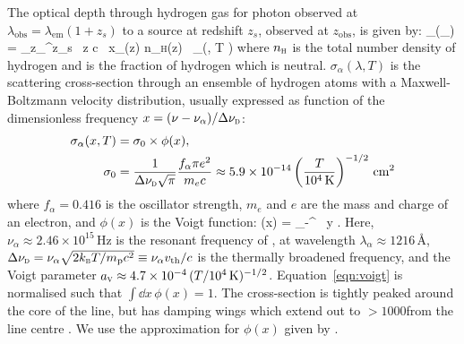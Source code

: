 \documentclass[fleqn,usenatbib]{mnras}
\begin{document}

The \lya optical depth through hydrogen gas for photon observed at $\lambda_\mathrm{obs} = \lambda_\mathrm{em}(1+z_s)$ to a source at redshift $z_s$, observed at $z_\mathrm{obs}$, is given by:
%
\BE \label{eqn:optdepth}
\tau_\alpha(\lambda_) = \int_{z_}^{z_s} \, \dd z \; c  \, x_\HI(z) n_\textsc{h}(z)  \, \sigma_\alpha\left(, T \right)
\EE
%
where $n_\textsc{h}$ is the total number density of hydrogen and \xHI is the fraction of hydrogen which is neutral. $\sigma_\alpha(\lambda, T)$ is the \lya scattering cross-section through an ensemble of hydrogen atoms with a Maxwell-Boltzmann velocity distribution, usually expressed as function of the dimensionless frequency $x = (\nu - \nu_\alpha)/\Delta \nu_\textsc{d}$:
%
\begin{align} \label{eqn:crosssection}
\sigma_\alpha(x, T) &= \sigma_0 \times \phi(x),\\
\sigma_0 &= \frac{1}{\Delta \nu_\textsc{d} \sqrt{\pi}} \frac{f_\alpha \pi e^2}{m_e c} \approx 5.9 \times 10^{-14} \left(\frac{T}{10^4\,\mathrm{K}}\right)^{-1/2} \cm^2 \nonumber
\end{align}
%
where $f_\alpha = 0.416$ is the \lya oscillator strength, $m_e$ and $e$ are the mass and charge of an electron, and $\phi(x)$ is the Voigt function:
%
\BE \label{eqn:voigt}
\phi(x) =  \int_{-\infty}^{\infty} \, \dd y \; .
\EE
%
Here, $\nu_\alpha \approx 2.46\times10^{15}$\,Hz is the resonant frequency of \lya, at wavelength $\lambda_\alpha \approx 1216$\,\AA, $\Delta \nu_\textsc{d} = \nu_\alpha \sqrt{2k_\textsc{b}T/m_\mathrm{p}c^2} \equiv \nu_\alpha v_\textrm{th}/c$ is the thermally broadened frequency, and the Voigt parameter $a_\textsc{v} \approx 4.7\times10^{-4}\,(T/10^4\,\mathrm{K})^{-1/2}$. Equation~\eqref{eqn:voigt} is normalised such that $\int \dd x \, \phi(x) =1$. The cross-section is tightly peaked around the core of the line, but has damping wings which extend out to $>1000$\kms from the line centre \citep[e.g.,][]{Dijkstra2014}. We use the approximation for $\phi(x)$ given by \citet{Tasitsiomi2006}.
\end{document}
